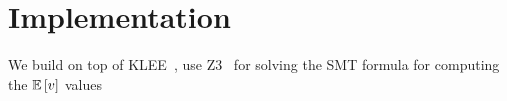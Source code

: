 \section{Implementation}
\label{sec:implementation}

We build on top of KLEE~\cite{klee_main_2008}, use Z3~\cite{z3_solver_2008} for solving the SMT formula for computing the $\mathbb{E}\left[ v \right]$ values